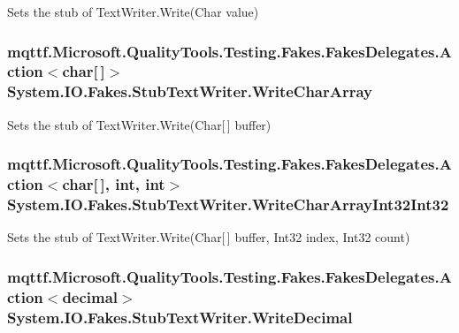 Sets the stub of Text\-Writer.\-Write(\-Char value)

\hypertarget{class_system_1_1_i_o_1_1_fakes_1_1_stub_text_writer_a642224e083054f64d4a18e085fd00383}{
\subsubsection[{Write\-Char\-Array}]{\setlength{\rightskip}{0pt plus 5cm}mqttf.\-Microsoft.\-Quality\-Tools.\-Testing.\-Fakes.\-Fakes\-Delegates.\-Action$<$char\mbox{[}$\,$\mbox{]}$>$ System.\-I\-O.\-Fakes.\-Stub\-Text\-Writer.\-Write\-Char\-Array}}\label{class_system_1_1_i_o_1_1_fakes_1_1_stub_text_writer_a642224e083054f64d4a18e085fd00383}


Sets the stub of Text\-Writer.\-Write(\-Char\mbox{[}$\,$\mbox{]} buffer)

\hypertarget{class_system_1_1_i_o_1_1_fakes_1_1_stub_text_writer_aac2b39131f9e03044f351f8dd0cc376b}{
\subsubsection[{Write\-Char\-Array\-Int32\-Int32}]{\setlength{\rightskip}{0pt plus 5cm}mqttf.\-Microsoft.\-Quality\-Tools.\-Testing.\-Fakes.\-Fakes\-Delegates.\-Action$<$char\mbox{[}$\,$\mbox{]}, int, int$>$ System.\-I\-O.\-Fakes.\-Stub\-Text\-Writer.\-Write\-Char\-Array\-Int32\-Int32}}\label{class_system_1_1_i_o_1_1_fakes_1_1_stub_text_writer_aac2b39131f9e03044f351f8dd0cc376b}


Sets the stub of Text\-Writer.\-Write(\-Char\mbox{[}$\,$\mbox{]} buffer, Int32 index, Int32 count)

\hypertarget{class_system_1_1_i_o_1_1_fakes_1_1_stub_text_writer_a10a6ad440fc40904b40c9ef5a9622d8d}{
\subsubsection[{Write\-Decimal}]{\setlength{\rightskip}{0pt plus 5cm}mqttf.\-Microsoft.\-Quality\-Tools.\-Testing.\-Fakes.\-Fakes\-Delegates.\-Action$<$decimal$>$ System.\-I\-O.\-Fakes.\-Stub\-Text\-Writer.\-Write\-Decimal}}\label{class_system_1_1_i_o_1_1_fakes_1_1_stub_text_writer_a10a6ad440fc40904b40c9ef5a9622d8d}


